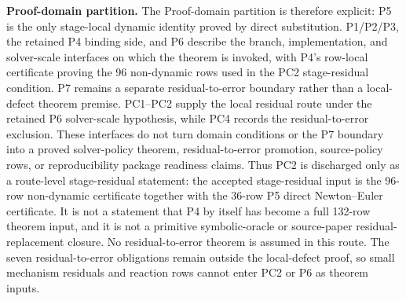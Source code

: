 \documentclass[preprint,12pt]{elsarticle}
\begin{document}
\noindent\textbf{Proof-domain partition.}
The Proof-domain partition is therefore explicit: P5 is the only stage-local dynamic identity proved by
direct substitution.  P1/P2/P3, the retained P4 binding side, and P6 describe
the branch, implementation, and solver-scale interfaces on which the theorem
is invoked, with P4's row-local certificate proving the 96 non-dynamic rows
used in the PC2 stage-residual condition.  P7 remains a separate
residual-to-error boundary rather than a local-defect theorem
premise.  PC1--PC2 supply the local residual route under the retained P6
solver-scale hypothesis, while PC4 records the residual-to-error exclusion. These
interfaces do not turn domain conditions or the P7 boundary into
a proved solver-policy theorem,
residual-to-error promotion, source-policy rows, or reproducibility package readiness
claims.  Thus PC2 is discharged only as a route-level stage-residual
statement: the
accepted stage-residual input is the 96-row non-dynamic certificate together
with the 36-row P5 direct Newton--Euler certificate. It is not a statement
that P4 by itself has become a full 132-row theorem input, and it is not a primitive
symbolic-oracle or source-paper residual-replacement closure.
No residual-to-error theorem is assumed in this route. The seven
residual-to-error obligations remain outside the local-defect proof, so small
mechanism residuals and reaction rows cannot enter PC2 or P6 as theorem
inputs.
\end{document}
